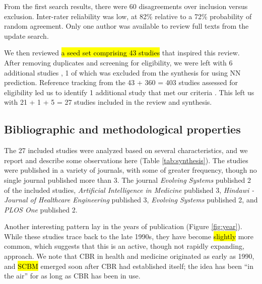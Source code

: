 \documentclass[sn-mathphys,Numbered,pdflatex]{sn-jnl}
\theoremstyle{remark}
\theoremstyle{definition}
\begin{document}
From the first search results, there were 60 disagreements over
inclusion versus exclusion. Inter-rater reliability was low, at 82\%
relative to a 72\% probability of random agreement. Only one author was
available to review full texts from the update search.

We then reviewed \hl{a seed set comprising 43 studies} that inspired
this review. After removing duplicates and screening for eligibility, we
were left with 6 additional studies
\citep{Park2006, Lowsky2013, Lee2015, Ng2015, Lee2017, Wang2019}, 1 of
which was excluded from the synthesis for using NN prediction. Reference
tracking from the 43 + 360 = 403 studies assessed for eligibility led us
to identify 1 additional study that met our criteria
\citep{Kasabov2010}. This left us with 21 + 1 + 5 = 27 studies included
in the review and synthesis.

\subsection{Bibliographic and methodological
properties}\label{bibliographic-and-methodological-properties}

The 27 included studies were analyzed based on several characteristics,
and we report and describe some observations here (Table
\ref{tab:synthesis}). The studies were published in a variety of
journals, with some of greater frequency, though no single journal
published more than 3. The journal \emph{Evolving Systems} published 2
of the included studies, \emph{Artificial Intelligence in Medicine}
published 3, \emph{Hindawi - Journal of Healthcare Engineering}
published 3, \emph{Evolving Systems} published 2, and \emph{PLOS One}
published 2.

Another interesting pattern lay in the years of publication (Figure
\ref{fig:year}). While these studies trace back to the late 1990s, they
have become \hl{slightly }more common, which suggests that this is an
active, though not rapidly expanding, approach. We note that CBR in
health and medicine originated as early as 1990, and \hl{SCBM} emerged
soon after CBR had established itself; the idea has been ``in the air''
for as long as CBR has been in use.

\small
\end{document}
